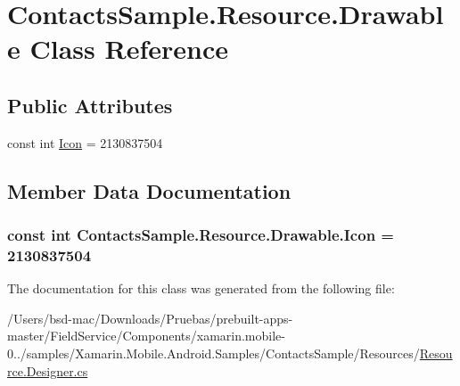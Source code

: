 \hypertarget{class_contacts_sample_1_1_resource_1_1_drawable}{\section{Contacts\+Sample.\+Resource.\+Drawable Class Reference}
\label{class_contacts_sample_1_1_resource_1_1_drawable}
}
\subsection*{Public Attributes}
\begin{DoxyCompactItemize}
\item 
const int \hyperlink{class_contacts_sample_1_1_resource_1_1_drawable_ab186c59f744af4ee691629b2ed7f68bb}{Icon} = 2130837504
\end{DoxyCompactItemize}


\subsection{Member Data Documentation}
\hypertarget{class_contacts_sample_1_1_resource_1_1_drawable_ab186c59f744af4ee691629b2ed7f68bb}{
\subsubsection[{Icon}]{\setlength{\rightskip}{0pt plus 5cm}const int Contacts\+Sample.\+Resource.\+Drawable.\+Icon = 2130837504}}\label{class_contacts_sample_1_1_resource_1_1_drawable_ab186c59f744af4ee691629b2ed7f68bb}


The documentation for this class was generated from the following file\+:\begin{DoxyCompactItemize}
\item 
/\+Users/bsd-\/mac/\+Downloads/\+Pruebas/prebuilt-\/apps-\/master/\+Field\+Service/\+Components/xamarin.\+mobile-\/0../samples/\+Xamarin.\+Mobile.\+Android.\+Samples/\+Contacts\+Sample/\+Resources/\hyperlink{_components_2xamarin_8mobile-0_86_81_2samples_2_xamarin_8_mobile_8_android_8_samples_2_contacts_d56de22a85d1f6d80155675d1a06eae3}{Resource.\+Designer.\+cs}\end{DoxyCompactItemize}
